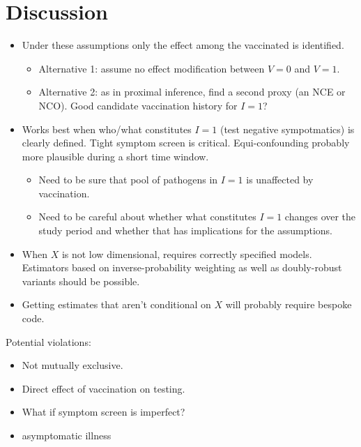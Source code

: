 \documentclass[11pt]{article}
\begin{document}
\section{Discussion} \label{sec:discussion}

\begin{itemize}
    \item Under these assumptions only the effect among the vaccinated is identified.
    \begin{itemize}
        \item Alternative 1: assume no effect modification between $V = 0$ and $V = 1$.
        \item Alternative 2: as in proximal inference, find a second proxy (an NCE or NCO). Good candidate vaccination history for $I = 1$?
    \end{itemize}
    \item Works best when who/what constitutes $I = 1$ (test negative sympotmatics) is clearly defined. Tight symptom screen is critical. Equi-confounding probably more plausible during a short time window.
    \begin{itemize}
        \item Need to be sure that pool of pathogens in $I = 1$ is unaffected by vaccination.
        \item Need to be careful about whether what constitutes $I = 1$ changes over the study period and whether that has implications for the assumptions. 
    \end{itemize}
    \item When $X$ is not low dimensional, requires correctly specified models. Estimators based on inverse-probability weighting as well as doubly-robust variants should be possible. 
    \item Getting estimates that aren't conditional on $X$ will probably require bespoke code. 
\end{itemize}


Potential violations:
\begin{itemize}
    \item Not mutually exclusive.
    \item Direct effect of vaccination on testing.
    \item What if symptom screen is imperfect?
    \item asymptomatic illness
\end{itemize}




\end{document}
